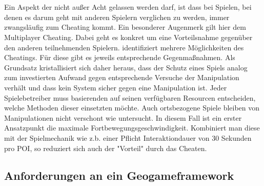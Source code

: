 \\\\
Ein Aspekt der nicht außer Acht gelassen werden darf, ist dass bei Spielen, bei denen es darum geht mit anderen Spielern verglichen zu werden, immer zwangsläufig zum Cheating kommt. \textcite{Consalvo.2005} Ein besonderer Augenmerk gilt hier dem Multiplayer Cheating. Dabei geht es konkret um eine Vorteilsnahme gegenüber den anderen teilnehmenden Spielern.
\textcite{Yan.2005} identifiziert mehrere Möglichkeiten des Cheatings. Für diese gibt es jeweils entsprechende Gegenmaßnahmen. Als Grundsatz kristallisiert sich daher heraus, dass der Schutz eines Spiels analog zum investierten Aufwand gegen entsprechende Versuche der Manipulation verhält und dass kein System sicher gegen eine Manipulation ist.
Jeder Spielebetreiber muss basierenden auf seinen verfügbaren Resourcen entscheiden, welche Methoden dieser einsetzten möchte. 
Auch ortsbezogene Spiele bleiben von Manipulationen nicht verschont wie \textcite{He.2011} untersucht.
In diesem Fall ist ein erster Ansatzpunkt die maximale Fortbewegungsgeschwindigkeit. Kombiniert man diese mit der Spielmechanik wie z.b. einer Pflicht Interaktiondauer von 30 Sekunden pro POI, so reduziert sich auch der "Vorteil" durch das Cheaten.

%
\subsection*{Anforderungen an ein Geogameframework}

